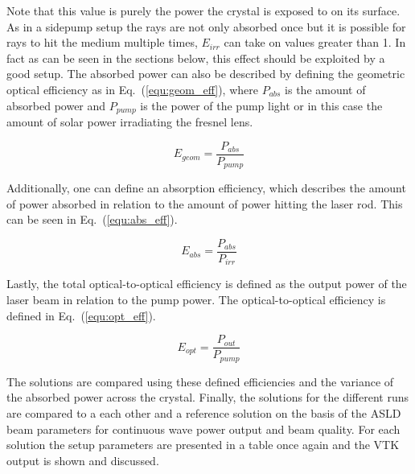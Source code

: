 \documentclass[a4paper,10pt]{article}
\newcommand{\equref}[1]{Eq.~(\ref{#1})}
\begin{document}
    Note that this value is purely the power the crystal is exposed
    to on its surface.
    As in a sidepump setup the rays are not only absorbed once but
    it is possible for rays to hit the medium multiple times,
    $E_{irr}$ can take on values greater than 1.
    In fact as can be seen in the sections below, this effect should
    be exploited by a good setup.
    The absorbed power can also be described by defining the geometric
    optical efficiency as in \equref{equ:geom_eff}, where
    $P_{abs}$ is the amount of absorbed power and $P_{pump}$ is
    the power of the pump light or in this case the amount of
    solar power irradiating the fresnel lens.

    \begin{equation}
        \label{equ:geom_eff}
        E_{geom} = \frac{P_{abs}}{P_{pump}}
    \end{equation}

    Additionally, one can define an absorption efficiency, which
    describes the amount of power absorbed in relation to the
    amount of power hitting the laser rod. 
    This can be seen in \equref{equ:abs_eff}.

    \begin{equation}
        \label{equ:abs_eff}
        E_{abs} = \frac{P_{abs}}{P_{irr}}
    \end{equation}

    Lastly, the total optical-to-optical efficiency is defined as
    the output power of the laser beam in relation to the pump
    power.
    The optical-to-optical efficiency is defined in \equref{equ:opt_eff}.

    \begin{equation}
        \label{equ:opt_eff}
        E_{opt} = \frac{P_{out}}{P_{pump}}
    \end{equation}

    The solutions are compared using these defined efficiencies and
    the variance of the absorbed power across the crystal.
    Finally, the solutions for the different runs are compared to a
    each other and a 
    reference solution on the basis of the ASLD beam parameters
    for continuous wave power output and beam quality.
    For each solution the setup parameters are presented in a table
    once again and the VTK output is shown and discussed.
\end{document}
